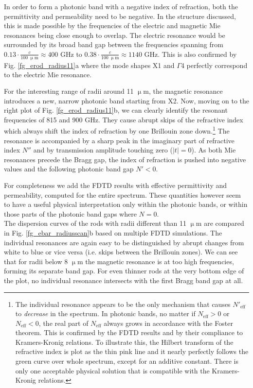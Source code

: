 {In order to form a photonic band with a negative index of refraction, both the permittivity and permeability need to be negative. In the structure discussed, this is made possible by the frequencies of the electric and magnetic Mie resonances being close enough to overlap.
The electric resonance would be surrounded by its broad band gap between the frequencies spanning from $0.13 \cdot\frac{c}{100\;\upmu\text{m}} \approx 400$ GHz to  $0.38 \cdot\frac{c}{100\;\upmu\text{m}} \approx 1140$ GHz. This is also confirmed by Fig. \ref{fg_erod_radius11}a where the mode shapes X1 and $\Gamma$4 perfectly correspond to the electric Mie resonance. 

For the interesting range of radii around 11 $\upmu$m, the magnetic resonance introduces a new, narrow photonic band starting from X2. Now, moving on to the right plot of Fig. \ref{fg_erod_radius11}b, we can clearly identify the resonant frequencies of 815 and 900 GHz. They cause abrupt skips of the refractive index which always shift the index of refraction by one Brillouin zone down.\footnote{The individual resonance appears to be the only mechanism that causes $N'_{\text{eff}}$ to \textit{decrease} in the spectrum. In photonic bands, no matter if $N_{\text{eff}} > 0$  or $N_{\text{eff}} < 0$, the real part of $N_{\text{eff}}$ always grows in accordance with the Foster theorem. This is confirmed by the FDTD results and by their compliance to Kramers-Kronig relations. To illustrate this, the Hilbert transform of the refractive index is plot as the thin pink line and it nearly perfectly follows the green curve over whole spectrum, except for an additive constant. There is  only one acceptable physical solution that is compatible with the Kramers-Kronig relations.}
The resonance is accompanied by a sharp peak in the imaginary part of refractive index $N''$ and by transmission amplitude touching zero ($|t| = 0$). As both Mie resonances precede the Bragg gap, the index of refraction is pushed into negative values and the following photonic band gap $N' < 0$.

For completeness we add the FDTD results with effective permittivity and permeability, computed for the entire spectrum. These quantities however seem to have a useful physical interpretation only within the photonic bands, or within those parts of the photonic band gaps where $N = 0$. 
\\

The dispersion curves of the rods with radii different than 11 $\upmu$m are compared in Fig. \ref{fg_ebar_radiusscan}b based on multiple FDTD simulations. The individual resonances are again easy to be distinguished by abrupt changes from white to blue or vice versa (i.e. skips between the Brillouin zones). We can see that for radii below 8 $\upmu$m the magnetic resonance is at too high frequencies, forming its separate band gap. For even thinner rods at the very bottom edge of the plot, no individual resonance intersects with the first Bragg  band gap at all. 

}

